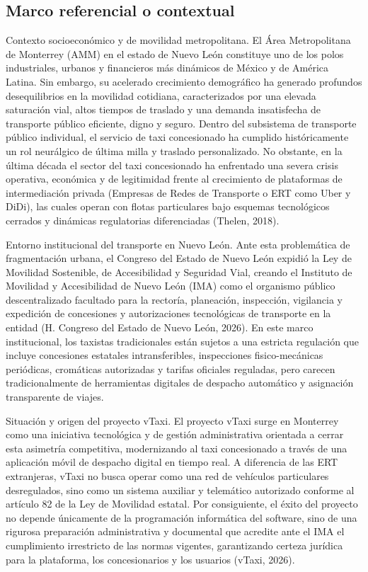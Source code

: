 {\subsection{Marco referencial o contextual}
Contexto socioeconómico y de movilidad metropolitana. El Área Metropolitana de Monterrey (AMM) en el estado de Nuevo León constituye uno de los polos industriales, urbanos y financieros más dinámicos de México y de América Latina. Sin embargo, su acelerado crecimiento demográfico ha generado profundos desequilibrios en la movilidad cotidiana, caracterizados por una elevada saturación vial, altos tiempos de traslado y una demanda insatisfecha de transporte público eficiente, digno y seguro. Dentro del subsistema de transporte público individual, el servicio de taxi concesionado ha cumplido históricamente un rol neurálgico de última milla y traslado personalizado. No obstante, en la última década el sector del taxi concesionado ha enfrentado una severa crisis operativa, económica y de legitimidad frente al crecimiento de plataformas de intermediación privada (Empresas de Redes de Transporte o ERT como Uber y DiDi), las cuales operan con flotas particulares bajo esquemas tecnológicos cerrados y dinámicas regulatorias diferenciadas (Thelen, 2018).


Entorno institucional del transporte en Nuevo León. Ante esta problemática de fragmentación urbana, el Congreso del Estado de Nuevo León expidió la Ley de Movilidad Sostenible, de Accesibilidad y Seguridad Vial, creando el Instituto de Movilidad y Accesibilidad de Nuevo León (IMA) como el organismo público descentralizado facultado para la rectoría, planeación, inspección, vigilancia y expedición de concesiones y autorizaciones tecnológicas de transporte en la entidad (H. Congreso del Estado de Nuevo León, 2026). En este marco institucional, los taxistas tradicionales están sujetos a una estricta regulación que incluye concesiones estatales intransferibles, inspecciones fisico-mecánicas periódicas, cromáticas autorizadas y tarifas oficiales reguladas, pero carecen tradicionalmente de herramientas digitales de despacho automático y asignación transparente de viajes.


Situación y origen del proyecto vTaxi. El proyecto vTaxi surge en Monterrey como una iniciativa tecnológica y de gestión administrativa orientada a cerrar esta asimetría competitiva, modernizando al taxi concesionado a través de una aplicación móvil de despacho digital en tiempo real. A diferencia de las ERT extranjeras, vTaxi no busca operar como una red de vehículos particulares desregulados, sino como un sistema auxiliar y telemático autorizado conforme al artículo 82 de la Ley de Movilidad estatal. Por consiguiente, el éxito del proyecto no depende únicamente de la programación informática del software, sino de una rigurosa preparación administrativa y documental que acredite ante el IMA el cumplimiento irrestricto de las normas vigentes, garantizando certeza jurídica para la plataforma, los concesionarios y los usuarios (vTaxi, 2026).


}
